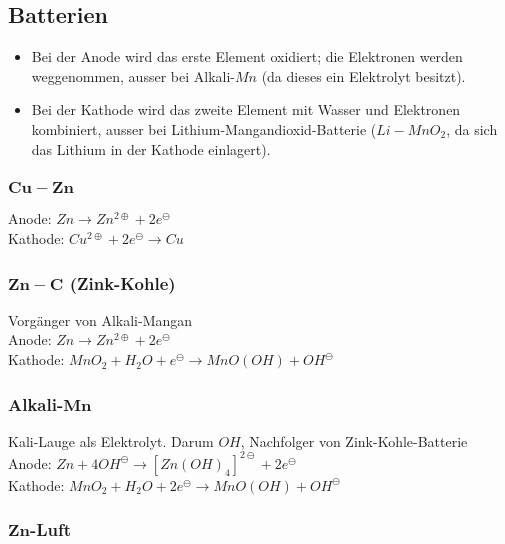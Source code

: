 \subsection{Batterien}

\begin{itemize}
	\item Bei der Anode wird das erste Element oxidiert; die Elektronen werden weggenommen, ausser bei Alkali-$Mn$ (da dieses ein Elektrolyt besitzt).
	\item Bei der Kathode wird das zweite Element mit Wasser und Elektronen kombiniert, ausser bei Lithium-Mangandioxid-Batterie ($Li-MnO_2$, da sich das Lithium in der Kathode einlagert).
\end{itemize}

\subsubsection{$\boldsymbol{Cu-Zn}$}

Anode: $Zn \rightarrow Zn^{2\oplus} + 2e^\ominus$\\

Kathode: $Cu^{2\oplus} + 2e^\ominus \rightarrow Cu$

\subsubsection{$\boldsymbol{Zn-C}$ (Zink-Kohle)}

Vorgänger von Alkali-Mangan\\

Anode: $Zn \rightarrow Zn^{2\oplus} + 2e^\ominus$\\

Kathode: $MnO_2 + H_2O + e^\ominus \rightarrow MnO(OH) + OH^\ominus$

\subsubsection{Alkali-$\boldsymbol{Mn}$}

Kali-Lauge als Elektrolyt. Darum $OH$, Nachfolger von Zink-Kohle-Batterie\\

Anode: $Zn + 4OH^\ominus \rightarrow [Zn(OH)_4]^{2\ominus} + 2e^\ominus$\\

Kathode: $MnO_2 + H_2O + 2e^\ominus \rightarrow MnO(OH) +OH^\ominus$

\subsubsection{$\boldsymbol{Zn}$-Luft}

